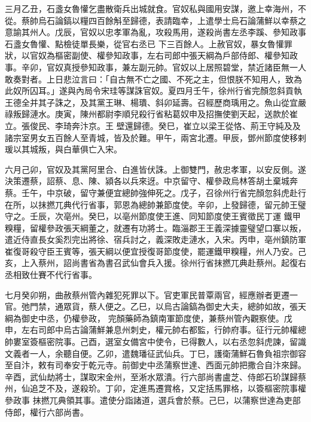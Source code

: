\begin{pinyinscope}
 三月乙丑，石盞女魯懽乞盡散衛兵出城就食。官奴私與國用安謀，邀上幸海州，不從。蔡帥烏石論鎬以糧四百餘斛至歸德，表請臨幸，上遣學士烏石論蒲鮮以幸蔡之意諭其州人。戊辰，官奴以忠孝軍為亂，攻殺馬用，遂殺尚書左丞李蹊、參知政事石盞女魯懽、點檢徒單長樂，從官右丞已
 下三百餘人。上赦官奴，暴女魯懽罪狀，以官奴為樞密副使、權參知政事，左右司郎中張天綱為戶部侍郎、權參知政事。辛卯，官奴真授參知政事，兼左副元帥。官奴以上居照碧堂，禁近諸臣無一人敢奏對者。上日悲泣言曰：「自古無不亡之國、不死之主，但恨朕不知用人，致為此奴所囚耳。」遂與內局令宋珪等謀誅官奴。夏四月壬午，徐州行省完顏忽斜貢執王德全并其子誅之，及其黨王琳、楊璝、斜卯延壽。召經歷商瑀用之。魚山從宜嚴祿叛歸漣水。庚寅，陳州都尉李順兒殺行省粘葛奴申及招撫使劉天起，送款於崔立。張俊民、李琦奔汴京。王
 壁還歸德。癸巳，崔立以梁王從恪、荊王守純及及諸宗室男女五百餘人至青城，皆及於難。甲午，兩宮北遷。甲辰，鄧州節度使移剌瑗以其城叛，與白華俱亡入宋。



 六月己卯，官奴及其黨阿里合、白進皆伏誅。上御雙門，赦忠孝軍，以安反側。遂決策遷蔡，詔蔡、息、陳、潁各以兵來迓。中京留守、權參政烏林答胡土棄城奔蔡。壬午，中京破，留守兼便宜總帥強伸死之。戊子，召徐州行省完顏忽斜虎赴行在所，以抹撚兀典代行省事，郭恩為總帥兼節度使。辛卯，上發歸德，留元帥王璧守之。壬辰，次亳州。癸巳，以亳州節度使王進、同知節度使王賓徵民丁運
 鐵甲糗糧，留權參政張天綱董之，就遷有功將士。臨淄郡王王義深據靈璧望口寨以叛，遣近侍直長女奚烈完出將徐、宿兵討之，義深敗走漣水，入宋。丙申，亳州鎮防軍崔復哥殺守臣王賓等，張天綱以便宜授復哥節度使，罷運鐵甲糗糧，州人乃安。己亥，上入蔡州，詔尚書省為書召武仙會兵入援。徐州行省抹撚兀典赴蔡州。起復右丞相致仕賽不代行省事。



 七月癸卯朔，曲赦蔡州管內雜犯死罪以下。官吏軍民普覃兩官，經應辦者更遷一官。弛門禁，通眾貨，蔡人便之。乙巳，以烏古論鎬為御史大夫，總帥如故，張天綱為御史中丞，仍權參政，
 完顏藥師為鎮南軍節度使，兼蔡州管內觀察使。戊申，左右司郎中烏古論蒲鮮兼息州刺史，權元帥右都監，行帥府事。征行元帥權總帥婁室簽樞密院事。己酉，選室女備宮中使令，已得數人，以右丞忽斜虎諫，留識文義者一人，余聽自便。乙卯，遣魏璠征武仙兵。丁巳，護衛蒲鮮石魯負祖宗御容至自汴，敕有司奉安于乾元寺。前御史中丞蒲察世達、西面元帥把撒合自汴來歸。辛酉，武仙劫將士，謀取宋金州，至淅水眾潰。行六部尚書盧芝、侍郎石玠謀歸蔡州，仙追芝不及，遂殺玠。丁卯，定進馬遷賞格，又定括馬罪格，以簽樞密院事權參政事
 抹撚兀典領其事。遣使分詣諸道，選兵會於蔡。己巳，以蒲察世達為吏部侍郎，權行六部尚書。




\end{pinyinscope}
